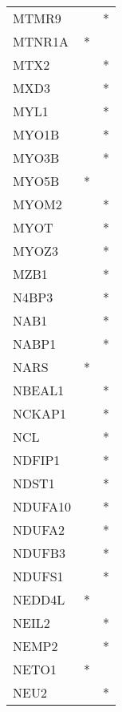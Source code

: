 \begin{longtable}{lcc}
MTMR9           &                &          * \\
MTNR1A          &              * &            \\
MTX2            &                &          * \\
MXD3            &                &          * \\
MYL1            &                &          * \\
MYO1B           &                &          * \\
MYO3B           &                &          * \\
MYO5B           &              * &            \\
MYOM2           &                &          * \\
MYOT            &                &          * \\
MYOZ3           &                &          * \\
MZB1            &                &          * \\
N4BP3           &                &          * \\
NAB1            &                &          * \\
NABP1           &                &          * \\
NARS            &              * &            \\
NBEAL1          &                &          * \\
NCKAP1          &                &          * \\
NCL             &                &          * \\
NDFIP1          &                &          * \\
NDST1           &                &          * \\
NDUFA10         &                &          * \\
NDUFA2          &                &          * \\
NDUFB3          &                &          * \\
NDUFS1          &                &          * \\
NEDD4L          &              * &            \\
NEIL2           &                &          * \\
NEMP2           &                &          * \\
NETO1           &              * &            \\
NEU2            &                &          * \\

\end{longtable}

